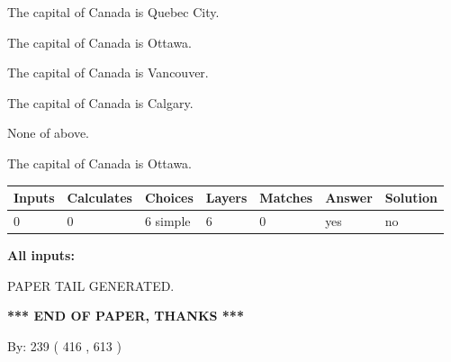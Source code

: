 \documentclass[12pt]{article}
\begin{document}
 
The capital of Canada is Quebec City.
 
 
The capital of Canada is Ottawa.
 
 
The capital of Canada is Vancouver.
 
 
The capital of Canada is Calgary.
 
 
 None of above.
 
 
\noindent{}
 
 
The capital of Canada is Ottawa.
 
 
\noindent{}
 
 
   
   
   
   
\noindent\begin{tabular}{|l|l|l|l|l|l|l|}
 \hline
Inputs & Calculates & Choices & Layers & Matches & Answer & Solution \\ \hline
 0  & 
 0  & 
 6
  simple  
  & 
 6  & 
 0  & 
  yes & 
  no 
  \\ \hline
 \end{tabular}
   
   
   
   
\noindent{}
   
   
   
   
\noindent\vspace{0.1in}\hspace{-0.08in} {\textbf{\Large{All inputs: }}}
   
   
   
   
   
   
 \vspace{0.2in}
 
   
   
\vspace{2.0in} PAPER TAIL GENERATED.
   
   
   
   
\vspace{1.0in} 
{\textbf{\large{ *** END OF PAPER, THANKS *** }}} 
   
   
\hspace{1.0in} By: 
 239 ( 416 ,  613 )
   
\end{document}
